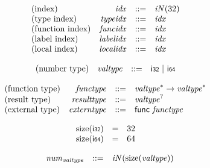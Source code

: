 \documentclass{article}
\begin{document}
\vspace{1ex}

$$
\begin{array}{@{}lrrl@{}l@{}}
	\mbox{(index)} & {\mathit{idx}} &::=& {\mathit{iN}}(32) \\
	\mbox{(type index)} & {\mathit{typeidx}} &::=& {\mathit{idx}} \\
	\mbox{(function index)} & {\mathit{funcidx}} &::=& {\mathit{idx}} \\
	\mbox{(label index)} & {\mathit{labelidx}} &::=& {\mathit{idx}} \\
	\mbox{(local index)} & {\mathit{localidx}} &::=& {\mathit{idx}} \\
\end{array}
$$

\vspace{1ex}

$$
\begin{array}{@{}lrrl@{}l@{}}
	\mbox{(number type)} & {\mathit{valtype}} &::=& \mathsf{i{\scriptstyle 32}} ~|~ \mathsf{i{\scriptstyle 64}} \\
\end{array}
$$

$$
\begin{array}{@{}lrrl@{}l@{}}
	\mbox{(function type)} & {\mathit{functype}} &::=& {{\mathit{valtype}}^\ast} \rightarrow {{\mathit{valtype}}^\ast} \\
	\mbox{(result type)} & {\mathit{resulttype}} &::=& {{\mathit{valtype}}^?} \\
	\mbox{(external type)} & {\mathit{externtype}} &::=& \mathsf{func}~{\mathit{functype}} \\
\end{array}
$$

\vspace{1ex}

$$
\begin{array}{@{}lcl@{}l@{}}
	{\mathrm{size}}(\mathsf{i{\scriptstyle 32}}) &=& 32 \\
	{\mathrm{size}}(\mathsf{i{\scriptstyle 64}}) &=& 64 \\
\end{array}
$$

$$
\begin{array}{@{}lrrl@{}l@{}}
	& {{\mathit{num}}}_{{\mathit{valtype}}} &::=& {\mathit{iN}}({\mathrm{size}}({\mathit{valtype}})) \\
\end{array}
$$

\vspace{1ex}
\end{document}
